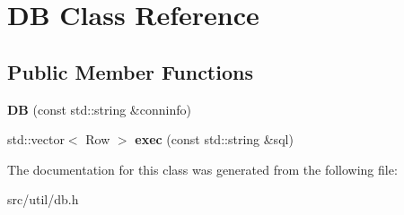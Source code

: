\hypertarget{class_d_b}{}\section{DB Class Reference}
\label{class_d_b}
\subsection*{Public Member Functions}
\begin{DoxyCompactItemize}
\item 
\mbox{\label{class_d_b_a85e1861d1c6f7139219b7f20f7cf527e}} 
{\bfseries DB} (const std\+::string \&conninfo)
\item 
\mbox{\label{class_d_b_a7ed8fbfd78327deab6d5b7e4998c28de}} 
std\+::vector$<$ Row $>$ {\bfseries exec} (const std\+::string \&sql)
\end{DoxyCompactItemize}


The documentation for this class was generated from the following file\+:\begin{DoxyCompactItemize}
\item 
src/util/db.\+h\end{DoxyCompactItemize}
